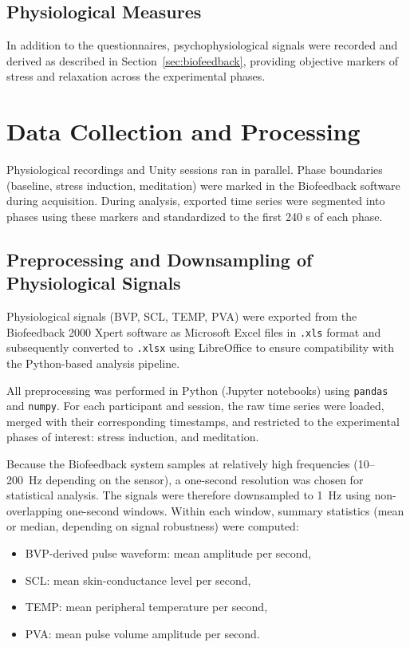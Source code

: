 \subsection{Physiological Measures}
In addition to the questionnaires, psychophysiological signals were recorded and
derived as described in Section~\ref{sec:biofeedback}, providing objective markers of
stress and relaxation across the experimental phases.

\section{Data Collection and Processing}
Physiological recordings and Unity sessions ran in parallel. Phase boundaries (baseline, stress induction, meditation) were marked in the Biofeedback software during acquisition. During analysis, exported time series were segmented into phases using these markers and standardized to the first 240 s of each phase.

\subsection{Preprocessing and Downsampling of Physiological Signals}
Physiological signals (BVP, SCL, TEMP, PVA) were exported from the
Biofeedback 2000 Xpert software as Microsoft Excel files in \texttt{.xls}
format and subsequently converted to \texttt{.xlsx} using LibreOffice to ensure
compatibility with the Python-based analysis pipeline.

All preprocessing was performed in Python (Jupyter notebooks) using
\texttt{pandas} and \texttt{numpy}. For each participant and session, the raw
time series were loaded, merged with their corresponding timestamps, and
restricted to the experimental phases of interest: stress
induction, and meditation.

Because the Biofeedback system samples at relatively high frequencies
(10--200~Hz depending on the sensor), a one-second resolution was chosen for
statistical analysis. The signals were therefore downsampled to 1~Hz using
non-overlapping one-second windows. Within each window, summary statistics
(mean or median, depending on signal robustness) were computed:

\begin{itemize}
  \item BVP-derived pulse waveform: mean amplitude per second,
  \item SCL: mean skin-conductance level per second,
  \item TEMP: mean peripheral temperature per second,
  \item PVA: mean pulse volume amplitude per second.
\end{itemize}


